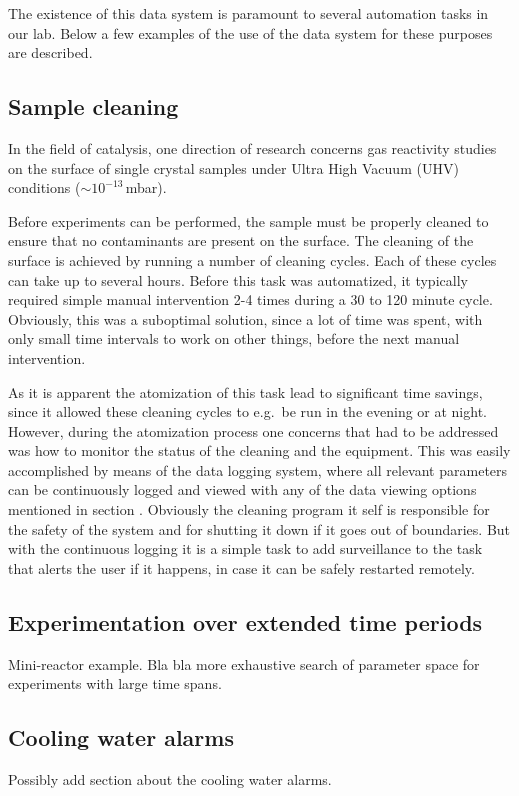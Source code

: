 The existence of this data system is paramount to several automation tasks
in our lab. Below a few examples of the use of the data system for
these purposes are described.

\subsection{Sample cleaning}
In the field of catalysis, one direction of research concerns gas
reactivity studies on the surface of single crystal samples under
Ultra High Vacuum (UHV)
conditions ($\sim10^{-13}$\,mbar).

Before experiments can be performed, the sample must be properly
cleaned to ensure that no contaminants are present on the surface. The
cleaning of the surface is achieved by running a number of cleaning
cycles. Each of these cycles can take up to several hours.%
Before this task was automatized, it typically required simple manual
intervention 2-4 times during a 30 to 120 minute cycle. Obviously, this
was a suboptimal solution, since a lot of time was spent, with only
small time intervals to work on other things, before the next manual
intervention.

As it is apparent the atomization of this task lead to significant
time savings, since it allowed these cleaning cycles to e.g.\ be run in
the evening or at night. However, during the atomization process one
concerns that had to be addressed was how to monitor the status of the
cleaning and the equipment. This was easily accomplished by means of
the data logging system, where all relevant parameters can be
continuously logged and viewed with any of the data viewing options
mentioned in section . Obviously the cleaning
program it self is responsible for the safety of the system and for
shutting it down if it goes out of boundaries. But with the continuous
logging it is a simple task to add surveillance to the task that
alerts the user if it happens, in case it can be safely restarted
remotely.

\subsection{Experimentation over extended time periods}

Mini-reactor example. Bla bla more exhaustive search of parameter
space for experiments with large time spans. 

\subsection{Cooling water alarms}
Possibly add section about the cooling water alarms. 